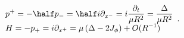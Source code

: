 \begin{equation}    \label{eq:dict1}
\begin{array}{l}
\displaystyle{
p^+ = - \half p_- = \half i \partial_{x^-} =  i\frac{\partial_{t}}{\mu R^2}
   =  \frac{\Delta}{\mu R^2}
}      \\
\displaystyle{
H = - p_+ = i \partial_{x^+} =  \mu \left( \Delta - 2 J_\phi \right) + O(R^{-1})
}
\end{array}.
\end{equation}

